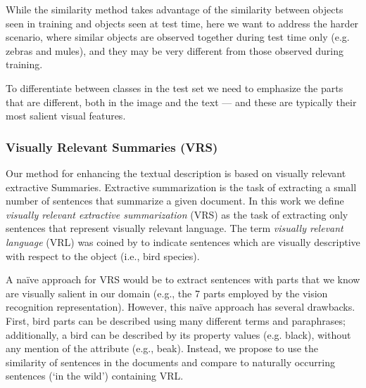 \documentclass[11pt,a4paper]{article}
\newcommand\gal[1]{\textcolor{bright}{\textbf{GAL:} #1 }}
\begin{document}
While the similarity method takes advantage of the similarity between objects seen in training and objects seen at test time, here we want to address the harder scenario, where similar objects are observed together during test time only (e.g. zebras and mules), and they may be very different from those observed during training. 

To differentiate between classes in the test set we need to emphasize the parts that are different, both in the image and the text --- and these are typically their most salient visual features. %

\subsubsection{Visually Relevant Summaries (VRS)}

Our method for enhancing the textual description is based on visually relevant extractive Summaries.
Extractive summarization is the task of extracting a small number of sentences that summarize a given document.
In this work we define {\em visually relevant extractive summarization} (VRS) as the task of extracting only sentences that represent {visually relevant} language. The term {\em visually relevant language} (VRL) was coined by \citet{winn2016detecting} to indicate sentences which are visually descriptive with respect to the object (i.e., bird species).


A {na\"{i}ve} approach for VRS would be to extract sentences with parts that we know are visually salient in our domain (e.g., the 7 parts employed by the vision recognition representation). However, this na\"{i}ve approach has several drawbacks. First, bird parts can be described using many different terms and paraphrases; additionally, a bird can be described by its property values (e.g. black), without any mention of the attribute (e.g., beak). 
Instead, we propose to use the similarity of sentences in the documents and compare to naturally occurring sentences (`in the wild') containing VRL. %
\end{document}
